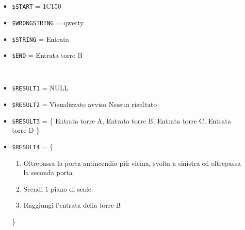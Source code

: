 \documentclass[../../SperimentazioniPratiche.tex]{subfiles}
\begin{document}
			\paragraph*{}
			\label{Prova11A.1}
			\begin{tcolorbox}[fonttitle=\bfseries, 
								adjusted title={\Large Prova 11A.1}, 
								breakable, 
								sharp corners=south,
								colback=white, 
								colframe=white!60!black]
								
				\begin{description}[leftmargin=0.7cm,labelwidth=!]
				
					\item[Input] \ \par 
        				\begin{itemize}
        					\item \verb|$START| = 1C150
							\item \verb|$WRONGSTRING| = qwerty
							\item \verb|$STRING| = Entrata 
							\item \verb|$END| = Entrata torre B
        				\end{itemize}
        				
        			\tcbline 
        				
        			\item[Output atteso] \ \par
        				\begin{itemize}
        					\item \verb|$RESULT1| = NULL
        					\item \verb|$RESULT2| = Visualizzato avviso Nessun risultato
        					\item \verb|$RESULT3| = \{
        						Entrata torre A, Entrata torre B, Entrata torre C, Entrata torre D
        						\}
        					\item \verb|$RESULT4| = \{
								\begin{enumerate}
        									\item Oltrepassa la porta antincendio più vicina, svolta a sinistra ed oltrepassa la seconda porta
        									\item Scendi 1 piano di scale
        									\item Raggiungi l'entrata della torre B
        								\end{enumerate}							       
        						\}
        				\end{itemize}

					\tcbline        				
        				

\end{description}
\end{tcolorbox}
\end{document}
